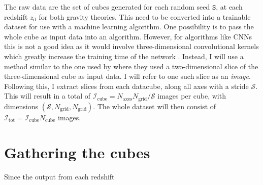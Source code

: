 %
%
The raw data are the set of cubes generated for each random seed $\mathtt{S}$, at each redshift $z_\mathrm{d}$ for both gravity theories. This need to be converted into a trainable dataset for use with a machine learning algorithm. One possibility is to pass the whole cube as input data into an algorithm. However, for algorithms like CNNs this is not a good idea as it would involve three-dimensional convolutional kernels which greatly increase the training time of the network . Instead, I will use a method similar to the one used by  where they used a two-dimensional slice of the three-dimensional cube as input data. I will refer to one such slice as an \textit{image}.  Following this, I extract slices from each datacube, along all axes with a stride $\mathcal{S}$. This will result in a total of $\mathcal{I}_\mathrm{cube}=N_\mathrm{axes}N_\mathrm{grid}/\mathcal{S}$ images per cube, with dimensions $(\mathcal{S}, N_\mathrm{grid}, N_\mathrm{grid})$. The whole dataset will then consist of $\mathcal{I}_\mathrm{tot} = \mathcal{I}_\mathrm{cube}N_\mathrm{cube}$ images.
\section{Gathering the cubes}
    Since the output from each redshift

